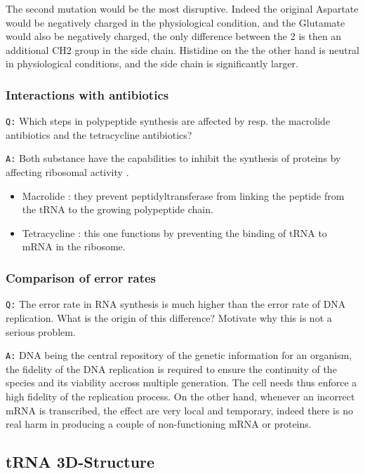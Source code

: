 \documentclass[11pt, a4paper,titlepage]{article}
\begin{document}
The second mutation would be the most disruptive. Indeed the original
Aspartate would be negatively charged in the physiological condition,
and the Glutamate would also be negatively charged, the only
difference between the 2 is then an additional CH2 group in the side
chain. Histidine on the the other hand is neutral in physiological
conditions, and the side chain is significantly larger.
\subsubsection{Interactions with antibiotics}
\label{sec-1-2-4}

\texttt{Q:} Which steps in polypeptide synthesis are affected by resp. the
macrolide antibiotics and the tetracycline antibiotics?

\texttt{A:} Both substance have the capabilities to inhibit the synthesis of
proteins by affecting ribosomal activity \cite{AntibioticsRibosomeEffect}. 

\begin{itemize}
\item Macrolide : they prevent peptidyltransferase from linking the
  peptide from the tRNA to the growing polypeptide chain.
\item Tetracycline : this one functions by preventing the binding of tRNA
  to mRNA in the ribosome.
\end{itemize}
\subsubsection{Comparison of error rates}
\label{sec-1-2-5}

\texttt{Q:} The error rate in RNA synthesis is much higher than the error rate
of DNA replication. What is the origin of this difference? Motivate
why this is not a serious problem.

\texttt{A:} DNA being the central repository of the genetic information for
an organism, the fidelity of the DNA replication is required to ensure
the continuity of the species and its viability accross multiple
generation. The cell needs thus enforce a high fidelity of the
replication process. On the other hand, whenever an incorrect mRNA is
transcribed, the effect are very local and temporary, indeed there is
no real harm in producing a couple of non-functioning mRNA or
proteins.
\subsection{tRNA 3D-Structure}
\label{sec-1-3}
\end{document}
